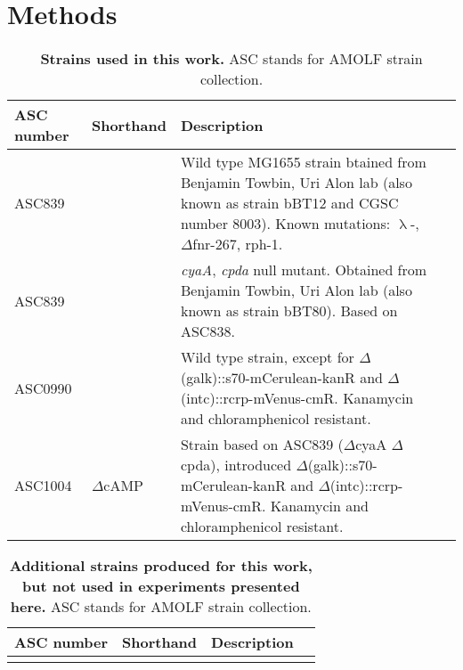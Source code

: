 \section*{Methods}



\begin{table}[h]
	\begin{tabularx}{\textwidth}{llXl}

	\textbf{ASC number}	& \textbf{Shorthand} & \textbf{Description}	\\
	\hline

	ASC839	& 				& Wild type MG1655 strain btained from Benjamin Towbin, Uri Alon lab (also known as strain bBT12 and CGSC number 8003). Known mutations: $\uplambda$-, 	$\Delta$fnr-267, rph-1. \cite{Towbin2017} \\
	ASC839	& 				& \textit{cyaA}, \textit{cpda} null mutant. Obtained from Benjamin Towbin, Uri Alon lab (also known as strain bBT80). Based on ASC838. \cite{Towbin2017} \\
	
	
	ASC0990  &  			& Wild type strain, except for $\Delta$(galk)::s70-mCerulean-kanR and $\Delta$(intc)::rcrp-mVenus-cmR. Kanamycin and chloramphenicol resistant. \\
	ASC1004  & $\Delta$cAMP & Strain based on ASC839 ($\Delta$cyaA $\Delta$cpda), introduced $\Delta$(galk)::s70-mCerulean-kanR and $\Delta$(intc)::rcrp-mVenus-cmR. Kanamycin and chloramphenicol resistant. \\
	
	\hline
	\end{tabularx}
	\caption{\textbf{Strains used in this work.} ASC stands for AMOLF strain collection.}
\end{table}

\begin{table}[h]
	\begin{tabularx}{\textwidth}{llXl}
		
		\textbf{ASC number}	& \textbf{Shorthand} & \textbf{Description}	\\
		\hline
				
		\red{XXX} & 				\red{XXX} & 				\red{XXX} \\
				
		\hline
	\end{tabularx}
	\caption{\textbf{Additional strains produced for this work, but not used in experiments presented here.} ASC stands for AMOLF strain collection.}
\end{table}

